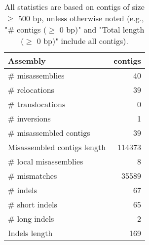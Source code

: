 \documentclass[12pt,a4paper]{article}
\begin{document}
\begin{table}[ht]
\begin{center}
\caption{All statistics are based on contigs of size $\geq$ 500 bp, unless otherwise noted (e.g., "\# contigs ($\geq$ 0 bp)" and "Total length ($\geq$ 0 bp)" include all contigs).}
\begin{tabular}{|l*{1}{|r}|}
\hline
Assembly & contigs \\ \hline
\# misassemblies & 40 \\ \hline
\hspace{5mm}\# relocations & 39 \\ \hline
\hspace{5mm}\# translocations & 0 \\ \hline
\hspace{5mm}\# inversions & 1 \\ \hline
\# misassembled contigs & 39 \\ \hline
Misassembled contigs length & 114373 \\ \hline
\# local misassemblies & 8 \\ \hline
\# mismatches & 35589 \\ \hline
\# indels & 67 \\ \hline
\hspace{5mm}\# short indels & 65 \\ \hline
\hspace{5mm}\# long indels & 2 \\ \hline
Indels length & 169 \\ \hline
\end{tabular}
\end{center}
\end{table}
\end{document}
